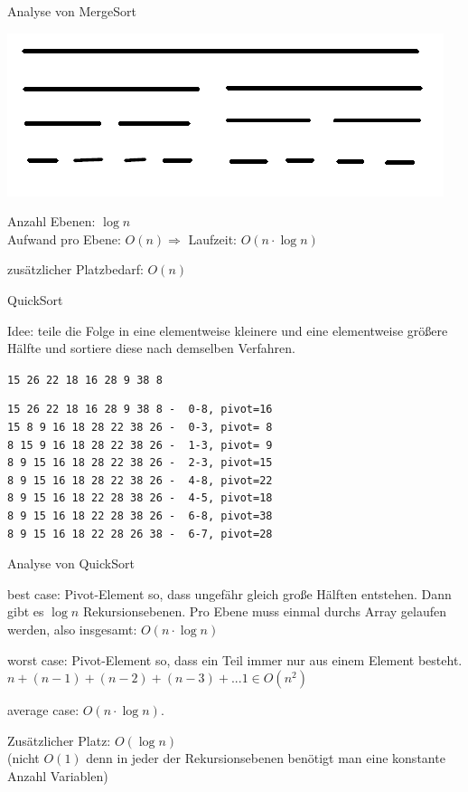 \documentclass{beamer}
\begin{document}
\begin{frame}[fragile]

Analyse von MergeSort\pause

\includegraphics[scale=0.6]{mergesort1.png} 

Anzahl Ebenen: $\log n$ \\ \pause
Aufwand pro Ebene: \pause $O(n)  \Rightarrow$ Laufzeit:  \pause  $O(n \cdot \log n)$  

zusätzlicher Platzbedarf: \pause $O(n)$

\end{frame}

\begin{frame}[fragile]
QuickSort 

Idee: teile die Folge in eine elementweise kleinere und eine elementweise größere Hälfte und sortiere diese
nach demselben Verfahren. 

\texttt{15 26 22 18 16 28 9 38 8} \pause

\begin{lstlisting}
15 26 22 18 16 28 9 38 8 -  0-8, pivot=16
15 8 9 16 18 28 22 38 26 -  0-3, pivot= 8
8 15 9 16 18 28 22 38 26 -  1-3, pivot= 9
8 9 15 16 18 28 22 38 26 -  2-3, pivot=15
8 9 15 16 18 28 22 38 26 -  4-8, pivot=22
8 9 15 16 18 22 28 38 26 -  4-5, pivot=18
8 9 15 16 18 22 28 38 26 -  6-8, pivot=38
8 9 15 16 18 22 28 26 38 -  6-7, pivot=28
\end{lstlisting}

\end{frame}


\begin{frame}[fragile]

Analyse von QuickSort

best case: \pause Pivot-Element so, dass ungefähr gleich große Hälften entstehen.  
Dann gibt es $\log n$ Rekursionsebenen. 
Pro Ebene muss einmal durchs Array gelaufen werden,  also insgesamt:  $O(n \cdot \log n)$

worst case: \pause Pivot-Element so, dass ein Teil immer nur aus einem Element besteht. \\ 
$n + (n-1) + (n-2) + (n-3) + ... 1 \in O(n^2)$

average case: $O(n \cdot \log n)$. 

Zusätzlicher Platz: \pause $O(\log n)$ \\
(nicht $O(1)$ denn in jeder der Rekursionsebenen benötigt man eine konstante Anzahl Variablen)

\end{frame}
\end{document}
